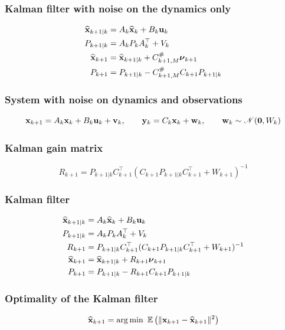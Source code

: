 \subsubsection{Kalman filter with noise on the dynamics only}
\begin{align*}
    \widehat{\mathbf x}_{k+1|k}&=A_k\widehat{\mathbf x}_k+B_k\mathbf u_k\\
    P_{k+1|k}&=A_kP_kA_k^\top+V_k\\
    \widehat{\mathbf x}_{k+1}&=\widehat{\mathbf x}_{k+1|k}+C_{k+1,M}^\#{\boldsymbol{\nu}}_{k+1}\\
    P_{k+1}&=P_{k+1|k}-C_{k+1,M}^\#C_{k+1}P_{k+1|k}
\end{align*}

\subsubsection{System with noise on dynamics and observations}
\begin{equation*}
    \mathbf x_{k+1}=A_k\mathbf x_k+B_k\mathbf u_k+\mathbf v_k,\qquad\mathbf y_k=C_k\mathbf x_k+\mathbf w_k,\qquad\mathbf w_k\sim\mathscr{N}(\mathbf 0,W_k)
\end{equation*}

\subsubsection{Kalman gain matrix}
\begin{equation*}
    R_{k+1}=P_{k+1|k}C_{k+1}^\top(C_{k+1}P_{k+1|k}C_{k+1}^\top+W_{k+1})^{-1}
\end{equation*}

\subsubsection{Kalman filter}
\begin{align*}
    \widehat{\mathbf x}_{k+1|k}&=A_k\widehat{\mathbf x}_k+B_k\mathbf u_k\\
    P_{k+1|k}&=A_kP_kA_k^\top+V_k\\
    R_{k+1}&=P_{k+1|k}C_{k+1}^\top(C_{k+1}P_{k+1|k}C_{k+1}^\top+W_{k+1})^{-1}\\
    \widehat{\mathbf x}_{k+1}&=\widehat{\mathbf x}_{k+1|k}+R_{k+1}{\boldsymbol{\nu}}_{k+1}\\
    P_{k+1}&=P_{k+1|k}-R_{k+1}C_{k+1}P_{k+1|k}
\end{align*}

\subsubsection{Optimality of the Kalman filter}
\begin{equation*}
    \widehat{\mathbf x}_{k+1}=\operatorname*{arg\,min}\ {\mathbb E}\left(\|\mathbf x_{k+1}-\widehat{\mathbf x}_{k+1}\|^2\right)
\end{equation*}

